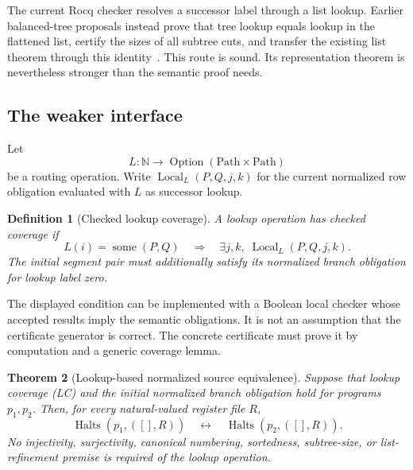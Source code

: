 \documentclass[11pt]{article}
\newtheorem{theorem}{Theorem}[section]
\newtheorem{definition}[theorem]{Definition}
\theoremstyle{remark}\newtheorem{remark}[theorem]{Remark}
\newcommand{\N}{\mathbb N}
\newcommand{\halts}{\operatorname{Halts}}
\newcommand{\some}{\operatorname{some}}
\begin{document}
The current Rocq checker resolves a successor label through a list lookup. Earlier balanced-tree proposals instead prove that tree lookup equals lookup in the flattened list, certify the sizes of all subtree cuts, and transfer the existing list theorem through this identity~\cite{balancedprior}. This route is sound. Its representation theorem is nevertheless stronger than the semantic proof needs.

\subsection{The weaker interface}
Let
\[
  L:\N\longrightarrow \operatorname{Option}(\mathrm{Path}\times\mathrm{Path})
\]
be a routing operation. Write $\operatorname{Local}_L(P,Q,j,k)$ for the current normalized row obligation evaluated with $L$ as successor lookup.

\begin{definition}[Checked lookup coverage]
A lookup operation has checked coverage if
\[
 L(i)=\some(P,Q)
 \quad\Longrightarrow\quad
 \exists j,k,\;\operatorname{Local}_L(P,Q,j,k).
 \tag{LC}
\]
The initial segment pair must additionally satisfy its normalized branch obligation for lookup label zero.
\end{definition}

The displayed condition can be implemented with a Boolean local checker whose accepted results imply the semantic obligations. It is not an assumption that the certificate generator is correct. The concrete certificate must prove it by computation and a generic coverage lemma.

\begin{theorem}[Lookup-based normalized source equivalence]
Suppose that lookup coverage (LC) and the initial normalized branch obligation hold for programs $p_1,p_2$. Then, for every natural-valued register file $R$,
\[
 \halts(p_1,([],R))\quad\longleftrightarrow\quad
 \halts(p_2,([],R)).
\]
No injectivity, surjectivity, canonical numbering, sortedness, subtree-size, or list-refinement premise is required of the lookup operation.
\end{theorem}
\end{document}
